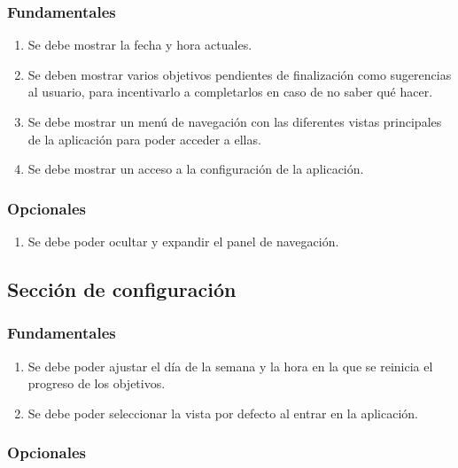 \documentclass[10pt, a4paper]{aqademic}
\begin{document}
\subsubsection*{Fundamentales}

\begin{enumerate}[resume]
	\item Se debe mostrar la fecha y hora actuales.
	
	\item Se deben mostrar varios objetivos pendientes de finalización como sugerencias al usuario, para incentivarlo a completarlos en caso de no saber qué hacer.
	
	\item Se debe mostrar un menú de navegación con las diferentes vistas principales de la aplicación para poder acceder a ellas.
	
	\item Se debe mostrar un acceso a la configuración de la aplicación.
\end{enumerate}

\subsubsection*{Opcionales}

\begin{enumerate}[resume]
	\item Se debe poder ocultar y expandir el panel de navegación.
\end{enumerate}


\subsection*{Sección de configuración}

\subsubsection*{Fundamentales}

\begin{enumerate}[resume]
	\item Se debe poder ajustar el día de la semana y la hora en la que se reinicia el progreso de los objetivos.
	
	\item Se debe poder seleccionar la vista por defecto al entrar en la aplicación.
\end{enumerate}

\subsubsection*{Opcionales}
\end{document}
